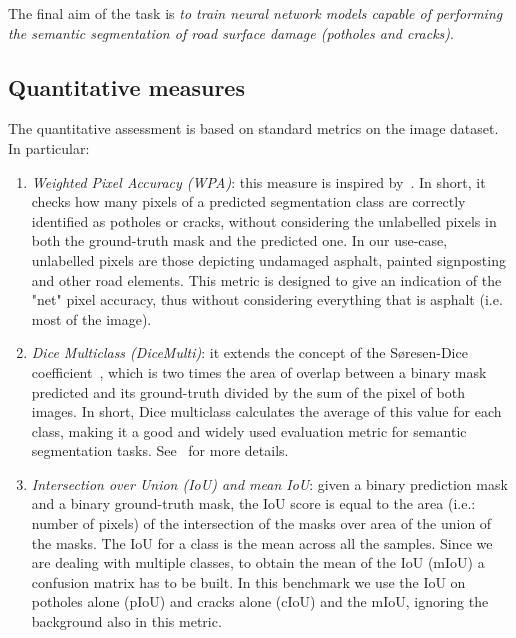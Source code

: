 \documentclass[twocolumn]{article}
\begin{document}
The final aim of the task is \emph{to train neural network models capable of performing the semantic segmentation of road surface damage (potholes and cracks)}. 

\subsection{Quantitative measures}
\label{sec:eval_mes}
The quantitative assessment is based on standard metrics on the image dataset. In particular:
\begin{enumerate}
    \item \emph{Weighted Pixel Accuracy (WPA)}: this measure is inspired by~\cite{BrostowFC:PRL2008,BrostowSFC:ECCV08}. In short, it checks how many pixels of a predicted segmentation class are correctly identified as potholes or cracks, without considering the unlabelled pixels in both the ground-truth mask and the predicted one. In our use-case, unlabelled pixels are those depicting undamaged asphalt, painted signposting and other road elements. This metric is designed to give an indication of the "net" pixel accuracy, thus without considering everything that is asphalt (i.e. most of the image).
    \item \emph{Dice Multiclass (DiceMulti)}: it extends the concept of the S{\o}resen-Dice coefficient~\cite{sorenson1948method}, which is two times the area of overlap between a binary mask predicted and its ground-truth divided by the sum of the pixel of both images. In short, Dice multiclass calculates the average of this value for each class, making it a good and widely used evaluation metric for semantic segmentation tasks. See~\cite{DICEMULTI} for more details.
    \item \emph{Intersection over Union (IoU) and mean IoU}: given a binary prediction mask and a binary ground-truth mask, the IoU score is equal to the area (i.e.: number of pixels) of the intersection of the masks over area of the union of the masks. The IoU for a class is the mean across all the samples. Since we are dealing with multiple classes, to obtain the mean of the IoU (mIoU) a confusion matrix has to be built. In this benchmark we use the IoU on potholes alone (pIoU) and cracks alone (cIoU) and the mIoU, ignoring the background also in this metric. 
\end{enumerate}
\end{document}
